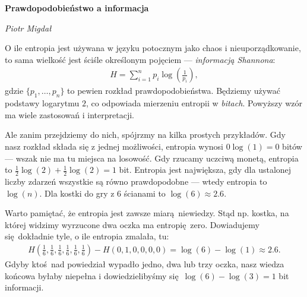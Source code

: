 \documentclass[10pt,a4paper]{article}
\begin{document}
\noindent\textbf{\LARGE Prawdopodobieństwo a informacja}

\medskip
\noindent\textit{\Large Piotr Migdał}

\medskip

O ile entropia jest używana w języku potocznym jako chaos i nieuporządkowanie, to sama wielkość jest ściśle określonym pojęciem --- \emph{informacją Shannona}:
%
%
\begin{align}
    H = \sum_{i=1}^{n} p_i \log \left(\tfrac{1}{p_i} \right),\label{eq:entropia}
\end{align}
%
%
gdzie $\{p_1, \ldots, p_n\}$ to pewien rozkład prawdopodobieństwa.
Będziemy używać podstawy logarytmu $2$, co odpowiada mierzeniu entropii w \emph{bitach}.
Powyższy wzór ma wiele zastosowań i interpretacji.

Ale zanim przejdziemy do nich, spójrzmy na kilka prostych przykładów.
Gdy nasz rozkład składa się z jednej możliwości, entropia wynosi $0 \log(1) = 0$ bitów --- wszak nie ma tu miejsca na losowość.
Gdy rzucamy uczciwą monetą, entropia to $\tfrac{1}{2} \log(2) + \tfrac{1}{2} \log(2) = 1$ bit.
Entropia jest największa, gdy dla ustalonej liczby zdarzeń wszystkie są równo prawdopodobne --- wtedy entropia to $\log(n)$.
Dla kostki do gry z $6$ ścianami to $\log(6)\approx 2.6$.

Warto pamiętać, że entropia jest zawsze miarą niewiedzy.
Stąd np. kostka, na której widzimy wyrzucone dwa oczka ma entropię zero.
Dowiadujemy się dokładnie tyle, o ile entropia zmalała, tu:
%
\begin{align}
 H(\tfrac{1}{6}, \tfrac{1}{6}, \tfrac{1}{6}, \tfrac{1}{6}, \tfrac{1}{6}, \tfrac{1}{6}) - H(0, 1, 0, 0, 0, 0) = \log(6) - \log(1) \approx 2.6.
\end{align}
%
Gdyby ktoś nad powiedział wypadło jedno, dwa lub trzy oczka, nasz wiedza końcowa byłaby niepełna i dowiedzielibyśmy się $\log(6) - \log(3) = 1 $ bit informacji.


\end{document}

